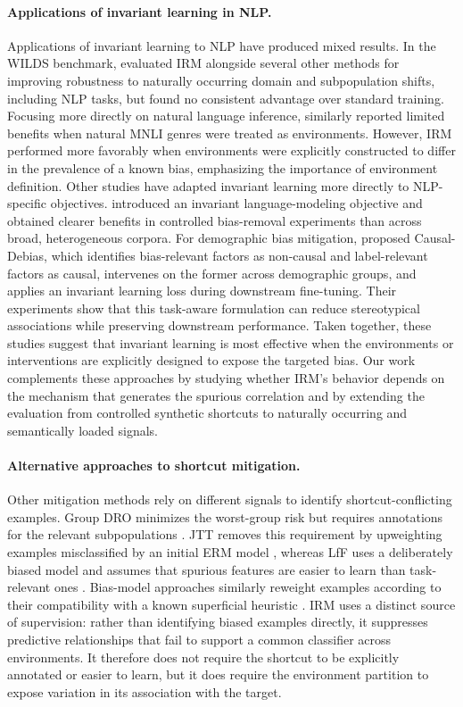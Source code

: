 \documentclass[11pt]{article}
\theoremstyle{definition}
\theoremstyle{plain}
\begin{document}
\paragraph{Applications of invariant learning in NLP.} Applications of invariant learning to NLP have produced mixed results. In the WILDS benchmark, \citet{koh2021wilds} evaluated IRM alongside several other methods for improving robustness to naturally occurring domain and subpopulation shifts, including NLP tasks, but found no consistent advantage over standard training. Focusing more directly on natural language inference, \citet{dranker2021irm} similarly reported limited benefits when natural MNLI genres were treated as environments. However, IRM performed more favorably when environments were explicitly constructed to differ in the prevalence of a known bias, emphasizing the importance of environment definition. Other studies have adapted invariant learning more directly to NLP-specific objectives. \citet{peyrard2022invariant} introduced an invariant language-modeling objective and obtained clearer benefits in controlled bias-removal experiments than across broad, heterogeneous corpora. For demographic bias mitigation, \citet{zhou2023causal} proposed Causal-Debias, which identifies bias-relevant factors as non-causal and label-relevant factors as causal, intervenes on the former across demographic groups, and applies an invariant learning loss during downstream fine-tuning. Their experiments show that this task-aware formulation can reduce stereotypical associations while preserving downstream performance. Taken together, these studies suggest that invariant learning is most effective when the environments or interventions are explicitly designed to expose the targeted bias. Our work complements these approaches by studying whether IRM's behavior depends on the mechanism that generates the spurious correlation and by extending the evaluation from controlled synthetic shortcuts to naturally occurring and semantically loaded signals.

\paragraph{Alternative approaches to shortcut mitigation.} Other mitigation methods rely on different signals to identify shortcut-conflicting examples. Group DRO minimizes the worst-group risk but requires annotations for the relevant subpopulations \citep{sagawa2019distributionally}. JTT removes this requirement by upweighting examples misclassified by an initial ERM model \citep{liu2021just}, whereas LfF uses a deliberately biased model and assumes that spurious features are easier to learn than task-relevant ones \citep{nam2020learning}. Bias-model approaches similarly reweight examples according to their compatibility with a known superficial heuristic \citep{utama2020towards}. IRM uses a distinct source of supervision: rather than identifying biased examples directly, it suppresses predictive relationships that fail to support a common classifier across environments. It therefore does not require the shortcut to be explicitly annotated or easier to learn, but it does require the environment partition to expose variation in its association with the target.
\end{document}
